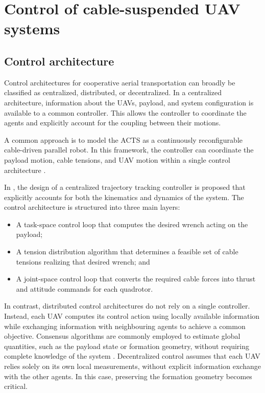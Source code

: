 \section{Control of cable-suspended UAV systems}

\subsection{Control architecture}

Control architectures for cooperative aerial transportation can broadly be classified as centralized, distributed, or decentralized. In a centralized architecture, information about the UAVs, payload, and system configuration is available to a common controller. This allows the controller to coordinate the agents and explicitly account for the coupling between their motions.

A common approach is to model the ACTS as a continuously reconfigurable cable-driven parallel robot. In this framework, the controller can coordinate the payload motion, cable tensions, and UAV motion within a single control architecture \cite{erskine_control_2019, masone_cooperative_2016}.

In \cite{masone_cooperative_2016}, the design of a centralized trajectory tracking controller is proposed that explicitly accounts for both the kinematics and dynamics of the system. The control architecture is structured into three main layers:
\begin{itemize}
    \item A task-space control loop that computes the desired wrench acting on the payload;
    \item A tension distribution algorithm that determines a feasible set of cable tensions realizing that desired wrench; and
    \item A joint-space control loop that converts the required cable forces into thrust and attitude commands for each quadrotor.
\end{itemize}

In contrast, distributed control architectures do not rely on a single controller. Instead, each UAV computes its control action using locally available information while exchanging information with neighbouring agents to achieve a common objective. Consensus algorithms are commonly employed to estimate global quantities, such as the payload state or formation geometry, without requiring complete knowledge of the system \cite{erskine_dynamic_2021}. Decentralized control assumes that each UAV relies solely on its own local measurements, without explicit information exchange with the other agents. In this case, preserving the formation geometry becomes critical.

